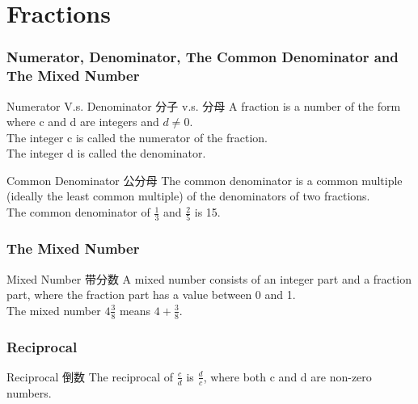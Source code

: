 \documentclass[
	11pt, %
	handout,
]{beamer}
\begin{document}
\section{Fractions}


\begin{frame}
\frametitle{Numerator, Denominator, The Common Denominator and The Mixed Number}
	\begin{block}{Numerator V.s. Denominator \quad 分子 v.s. 分母}
				A fraction is a number of the form where c and d are integers and \alert{$d\neq 0$}. \\
				The integer c is called the numerator of the fraction. \\  
				The integer d is called the denominator.
	\end{block}

	\begin{block}{Common Denominator \quad 公分母}
				The common denominator is a common multiple (ideally the least common multiple) of the denominators of two fractions.\\
				The common denominator of $\frac{1}{3}$ and $\frac{2}{5}$ is 15.
	\end{block}


\end{frame}

\begin{frame}
\frametitle{ The Mixed Number}

	\begin{block}{Mixed Number \quad 带分数}
	A mixed number consists of an integer part and a fraction part, where the fraction part has a value \alert{between 0 and 1}.\\
	The mixed number $4\frac{3}{8}$ means $4 + \frac{3}{8}$.
	\end{block}
\end{frame}

	

\begin{frame}
\frametitle{Reciprocal}

	\begin{block}{Reciprocal \quad 倒数}
	The reciprocal of $\frac{c}{d}$ is $\frac{d}{c}$, where both c and d are \alert{non-zero} numbers. 
	\end{block}
\end{frame}

	
\end{document}
